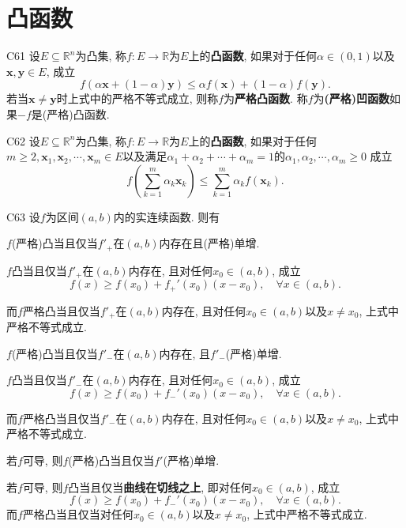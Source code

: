 \section{凸函数}
\begin{definition}{}{C61}
设\(E\subseteq\mathbb{R}^n\)为凸集, 称\(f:E\rightarrow\mathbb{R}\)为\(E\)上的\textbf{凸函数}, 如果对于任何\(\alpha\in(0,1)\)以及\(\boldsymbol{x,y}\in E\), 成立\[f(\alpha\boldsymbol{x}+(1-\alpha)\boldsymbol{y})\leqslant\alpha f(\boldsymbol{x})+(1-\alpha)f(\boldsymbol{y}).\]若当\(\boldsymbol{x}\ne\boldsymbol{y}\)时上式中的严格不等式成立, 则称\(f\)为\textbf{严格凸函数}. 称\(f\)为\textbf{(严格)凹函数}如果\(-f\)是(严格)凸函数.
\end{definition}
\begin{definition}{}{C62}
    设\(E\subseteq\mathbb{R}^n\)为凸集, 称\(f:E\rightarrow\mathbb{R}\)为\(E\)上的\textbf{凸函数}, 如果对于任何\(m\geqslant 2,\boldsymbol{x}_1,\boldsymbol{x}_2,\cdots,\boldsymbol{x}_m\in E\)以及满足\(\alpha_1+\alpha_2+\cdots+\alpha_m=1\)的\(\alpha_1,\alpha_2,\cdots,\alpha_m\geqslant 0\) 成立\[f\left(\sum_{k=1}^{m}\alpha_k\boldsymbol{x}_k\right)\leqslant\sum_{k=1}^{m}\alpha_kf\left(\boldsymbol{x}_k\right).\]
\end{definition}
\begin{theorem}{}{C63}
设\(f\)为区间\((a,b)\)内的实连续函数. 则有\begin{compactenum}[(i)]
\item \(f\)(严格)凸当且仅当\(f'_+\)在\((a,b)\)内存在且(严格)单增.
\item \(f\)凸当且仅当\(f'_+\)在\((a,b)\)内存在, 且对任何\(x_0\in (a,b)\), 成立\[f(x)\geqslant f(x_0)+f_+'(x_0)(x-x_0),\quad\forall x\in (a,b).\]

而\(f\)严格凸当且仅当\(f'_+\)在\((a,b)\)内存在, 且对任何\(x_0\in (a,b)\)以及\(x\ne x_0\), 上式中严格不等式成立.
\item \(f\)(严格)凸当且仅当\(f'_-\)在\((a,b)\)内存在, 且\(f'_-\)(严格)单增.
\item \(f\)凸当且仅当\(f'_-\)在\((a,b)\)内存在, 且对任何\(x_0\in (a,b)\), 成立\[f(x)\geqslant f(x_0)+f_-'(x_0)(x-x_0),\quad\forall x\in (a,b).\]

而\(f\)严格凸当且仅当\(f'_-\)在\((a,b)\)内存在, 且对任何\(x_0\in (a,b)\)以及\(x\ne x_0\), 上式中严格不等式成立.
\item 若\(f\)可导, 则\(f\)(严格)凸当且仅当\(f'\)(严格)单增.
\item 若\(f\)可导, 则\(f\)凸当且仅当\textbf{曲线在切线之上}, 即对任何\(x_0\in (a,b)\), 成立\[f(x)\geqslant f(x_0)+f_-'(x_0)(x-x_0),\quad\forall x\in (a,b).\]而\(f\)严格凸当且仅当对任何\(x_0\in (a,b)\)以及\(x\ne x_0\), 上式中严格不等式成立.
\end{compactenum}
\end{theorem}
